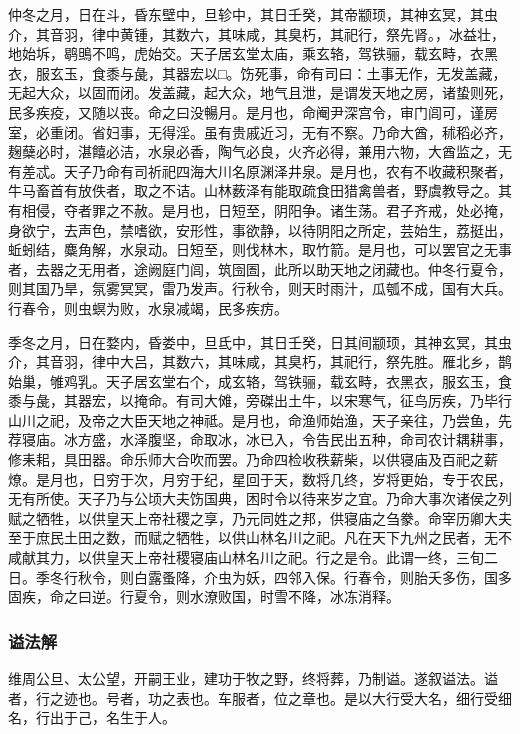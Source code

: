 \documentclass[]{article}
\begin{document}
仲冬之月，日在斗，昏东壁中，旦轸中，其日壬癸，其帝颛顼，其神玄冥，其虫介，其音羽，律中黄锺，其数六，其味咸，其臭朽，其祀行，祭先肾。，冰益壮，地始坼，鹖鴠不鸣，虎始交。天子居玄堂太庙，乘玄辂，驾铁骊，载玄畤，衣黑衣，服玄玉，食黍与彘，其器宏以□。饬死事，命有司曰：土事无作，无发盖藏，无起大众，以固而闭。发盖藏，起大众，地气且泄，是谓发天地之房，诸蛰则死，民多疾疫，又随以丧。命之曰没暢月。是月也，命阉尹深宫令，审门闾可，谨房室，必重闭。省妇事，无得淫。虽有贵戚近习，无有不察。乃命大酋，秫稻必齐，麹蘖必时，湛饎必洁，水泉必香，陶气必良，火齐必得，兼用六物，大酋监之，无有差忒。天子乃命有司祈祀四海大川名原渊泽井泉。是月也，农有不收藏积聚者，牛马畜首有放佚者，取之不诘。山林薮泽有能取疏食田猎禽兽者，野虞教导之。其有相侵，夺者罪之不赦。是月也，日短至，阴阳争。诸生荡。君子齐戒，处必掩，身欲宁，去声色，禁嗜欲，安形性，事欲静，以待阴阳之所定，芸始生，荔挺出，蚯蚓结，麋角解，水泉动。日短至，则伐林木，取竹箭。是月也，可以罢官之无事者，去器之无用者，途阙庭门闾，筑囹圄，此所以助天地之闭藏也。仲冬行夏令，则其国乃旱，氛雾冥冥，雷乃发声。行秋令，则天时雨汁，瓜瓠不成，国有大兵。行春令，则虫螟为败，水泉减竭，民多疾疠。

季冬之月，日在婺内，昏娄中，旦氐中，其日壬癸，日其间颛顼，其神玄冥，其虫介，其音羽，律中大吕，其数六，其味咸，其臭朽，其祀行，祭先胜。雁北乡，鹊始巢，雊鸡乳。天子居玄堂右个，成玄辂，驾铁骊，载玄畤，衣黑衣，服玄玉，食黍与彘，其器宏，以掩命。有司大傩，旁磔出土牛，以宋寒气，征鸟厉疾，乃毕行山川之祀，及帝之大臣天地之神祗。是月也，命渔师始渔，天子亲往，乃尝鱼，先荐寝庙。冰方盛，水泽腹坚，命取冰，冰已入，令告民出五种，命司农计耦耕事，修耒耜，具田器。命乐师大合吹而罢。乃命四检收秩薪柴，以供寝庙及百祀之薪燎。是月也，日穷于次，月穷于纪，星回于天，数将几终，岁将更始，专于农民，无有所使。天子乃与公顷大夫饬国典，困时令以待来岁之宜。乃命大事次诸侯之列赋之牺牲，以供皇天上帝社稷之享，乃元同姓之邦，供寝庙之刍豢。命宰历卿大夫至于庶民土田之数，而赋之牺牲，以供山林名川之祀。凡在天下九州之民者，无不咸献其力，以供皇天上帝社稷寝庙山林名川之祀。行之是令。此谓一终，三旬二日。季冬行秋令，则白露蚤降，介虫为妖，四邻入保。行春令，则胎夭多伤，国多固疾，命之曰逆。行夏令，则水潦败国，时雪不降，冰冻消释。

\hypertarget{header-n287}{%
\subsubsection{谥法解}\label{header-n287}}

维周公旦、太公望，开嗣王业，建功于牧之野，终将葬，乃制谥。遂叙谥法。谥者，行之迹也。号者，功之表也。车服者，位之章也。是以大行受大名，细行受细名，行出于己，名生于人。
\end{document}
